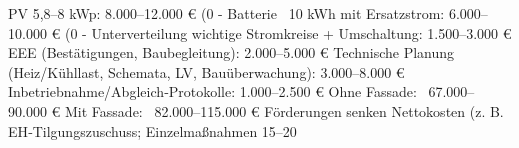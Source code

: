 \markdownRendererUlItem PV 5,8–8 kWp: 8.000–12.000 € (0 - Batterie ~10 kWh mit Ersatzstrom: 6.000–10.000 € (0 - Unterverteilung wichtige Stromkreise + Umschaltung: 1.500–3.000 €\markdownRendererUlItemEnd 
\markdownRendererUlEndTight \markdownRendererInterblockSeparator
{}
\markdownRendererSectionEnd \markdownRendererSectionBegin
{}\markdownRendererInterblockSeparator
{}\markdownRendererUlBeginTight
\markdownRendererUlItem EEE (Bestätigungen, Baubegleitung): 2.000–5.000 €\markdownRendererUlItemEnd 
\markdownRendererUlItem Technische Planung (Heiz/Kühllast, Schemata, LV, Bauüberwachung): 3.000–8.000 €\markdownRendererUlItemEnd 
\markdownRendererUlItem Inbetriebnahme/Abgleich‑Protokolle: 1.000–2.500 €\markdownRendererUlItemEnd 
\markdownRendererUlEndTight \markdownRendererInterblockSeparator
{}
\markdownRendererSectionEnd \markdownRendererSectionBegin
{}\markdownRendererInterblockSeparator
{}\markdownRendererUlBeginTight
\markdownRendererUlItem Ohne Fassade: ~67.000–90.000 €\markdownRendererUlItemEnd 
\markdownRendererUlItem Mit Fassade: ~82.000–115.000 €\markdownRendererUlItemEnd 
\markdownRendererUlEndTight \markdownRendererInterblockSeparator
{}Förderungen senken Nettokosten (z. B. EH‑Tilgungszuschuss; Einzelmaßnahmen 15–20
\markdownRendererSectionEnd 
\markdownRendererSectionEnd \markdownRendererDocumentEnd